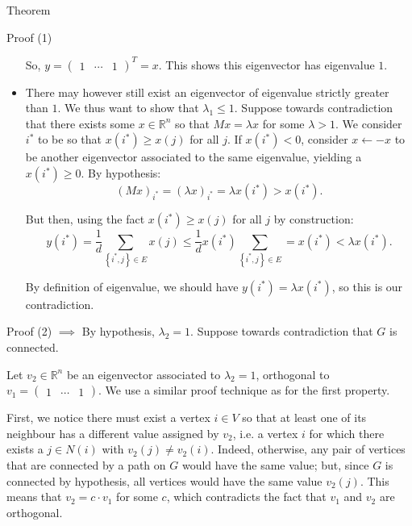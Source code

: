 \documentclass[a4paper]{article}
\begin{document}
\begin{parag}{Theorem}
\begin{subparag}{Proof (1)}
\begin{itemize}[left=0pt]
            So, $y = \begin{pmatrix} 1 & \cdots & 1 \end{pmatrix}^T = x$. This shows this eigenvector has eigenvalue $1$.

            \item  There may however still exist an eigenvector of eigenvalue strictly greater than $1$. We thus want to show that $\lambda_1 \leq 1$. Suppose towards contradiction that there exists some $x \in \mathbb{R}^n$ so that $M x = \lambda x$ for some $\lambda > 1$. We consider $i^*$ to be so that $x\left(i^*\right) \geq x\left(j\right)$ for all $j$. If $x\left(i^*\right) < 0$, consider $x \leftarrow -x$ to be another eigenvector associated to the same eigenvalue, yielding a $x\left(i^*\right) \geq 0$. By hypothesis: 
            \[\left(Mx\right)_{i^*} = \left(\lambda x\right)_{i^*} = \lambda x\left(i^*\right) > x\left(i^*\right).\]
            
            But then, using the fact $x\left(i^*\right) \geq x\left(j\right)$ for all $j$ by construction:
            \[y\left(i^*\right) = \frac{1}{d} \sum_{\left\{i^*, j\right\} \in E} x\left(j\right) \leq \frac{1}{d} x\left(i^*\right) \sum_{\left\{i^*, j\right\} \in E} = x\left(i^*\right) < \lambda x\left(i^*\right).\]

            By definition of eigenvalue, we should have $y\left(i^*\right) = \lambda x\left(i^*\right)$, so this is our contradiction.
        \end{itemize}
    \end{subparag}

    \begin{subparag}{Proof (2) $\implies$}
        By hypothesis, $\lambda_2 = 1$. Suppose towards contradiction that $G$ is connected.

        Let $v_2 \in \mathbb{R}^n$ be an eigenvector associated to $\lambda_2 = 1$, orthogonal to $v_1 = \begin{pmatrix} 1 & \cdots & 1 \end{pmatrix} $. We use a similar proof technique as for the first property.

        First, we notice there must exist a vertex $i \in V$ so that at least one of its neighbour has a different value assigned by $v_2$, i.e. a vertex $i$ for which there exists a $j \in N\left(i\right)$ with $v_2\left(j\right) \neq v_2\left(i\right)$. Indeed, otherwise, any pair of vertices that are connected by a path on $G$ would have the same value; but, since $G$ is connected by hypothesis, all vertices would have the same value $v_2\left(j\right)$. This means that $v_2 = c\cdot v_1$ for some $c$, which contradicts the fact that $v_1$ and $v_2$ are orthogonal.


\end{subparag}
\end{parag}
\end{document}
